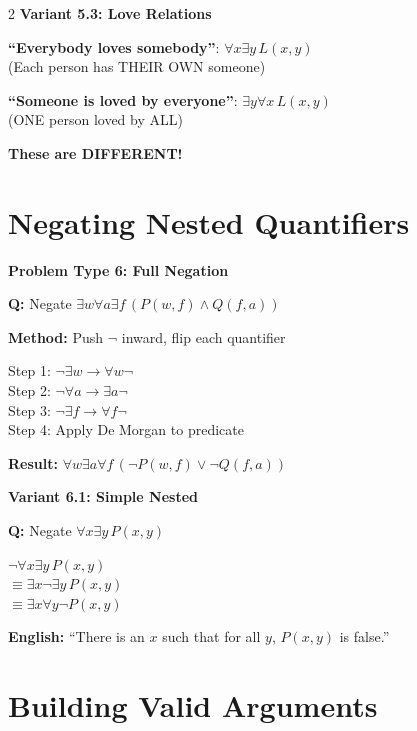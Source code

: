 \documentclass[8pt,a4paper]{article}
\newenvironment{exbox}[1][]{\vspace{2pt}\noindent\textbf{#1}\par\smallskip}{\vspace{2pt}}
\newenvironment{solbox}{\vspace{2pt}\begin{leftbar}}{\end{leftbar}\vspace{2pt}}
\begin{document}
\begin{multicols}{2}
\begin{exbox}[Variant 5.3: Love Relations]
\textbf{``Everybody loves somebody''}: $\forall x \exists y\, L(x,y)$\\
(Each person has THEIR OWN someone)

\textbf{``Someone is loved by everyone''}: $\exists y \forall x\, L(x,y)$\\
(ONE person loved by ALL)

\textbf{These are DIFFERENT!}
\end{exbox}

\section{Negating Nested Quantifiers}

\begin{exbox}[Problem Type 6: Full Negation]
\textbf{Q:} Negate $\exists w \forall a \exists f\, (P(w,f) \land Q(f,a))$

\textbf{Method:} Push $\neg$ inward, flip each quantifier

\begin{solbox}
Step 1: $\neg \exists w \to \forall w \neg$\\
Step 2: $\neg \forall a \to \exists a \neg$\\
Step 3: $\neg \exists f \to \forall f \neg$\\
Step 4: Apply De Morgan to predicate

\textbf{Result:} $\forall w \exists a \forall f\, (\neg P(w,f) \lor \neg Q(f,a))$
\end{solbox}
\end{exbox}

\begin{exbox}[Variant 6.1: Simple Nested]
\textbf{Q:} Negate $\forall x \exists y\, P(x,y)$

$\neg \forall x \exists y\, P(x,y)$\\
$\equiv \exists x \neg \exists y\, P(x,y)$\\
$\equiv \exists x \forall y \neg P(x,y)$

\textbf{English:} ``There is an $x$ such that for all $y$, $P(x,y)$ is false.''
\end{exbox}

\section{Building Valid Arguments}


\end{multicols}
\end{document}
